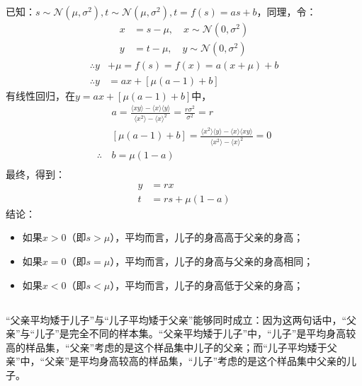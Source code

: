 \documentclass{article}
\begin{document}
\subsection{}
已知：$s\sim \mathcal{N}(\mu,\sigma^2), t\sim \mathcal{N}(\mu,\sigma^2), t = f(s) = as + b$，同理，令：
\begin{align*}
    x &= s - \mu,\quad x\sim \mathcal{N}(0,\sigma^2)\\
    y &= t - \mu,\quad y\sim \mathcal{N}(0,\sigma^2)
\end{align*}
\begin{align*}
    \therefore  y& + \mu = f(s) = f(x) = a(x + \mu) + b\\
    \therefore  y& = ax + [\mu(a-1)+b]
\end{align*}
有线性回归，在$y = ax + [\mu(a-1)+b]$中，
\begin{align*}
    &a = \frac{\langle xy \rangle-\langle x\rangle\langle y\rangle}{\langle x^2\rangle-\langle x\rangle^2} = \frac{r\sigma^2}{\sigma^2} = r\\
    &[\mu(a-1)+b] = \frac{\langle x^2\rangle\langle y\rangle-\langle x\rangle\langle xy\rangle}{\langle x^2\rangle-\langle x\rangle^2} = 0\\
    \therefore \,&b = \mu(1-a)\\
\end{align*}
最终，得到：
\begin{align*}
    y &= rx\\
    t &= rs + \mu(1-a)
\end{align*}
结论：
\begin{itemize}
    \item 如果$x>0$（即$s>\mu$），平均而言，儿子的身高高于父亲的身高；
    \item 如果$x=0$（即$s=\mu$），平均而言，儿子的身高与父亲的身高相同；
    \item 如果$x<0$（即$s<\mu$），平均而言，儿子的身高低于父亲的身高；
\end{itemize}

\subsection{}
“父亲平均矮于儿子”与“儿子平均矮于父亲”能够同时成立：因为这两句话中，“父亲”与“儿子”是完全不同的样本集。“父亲平均矮于儿子”中，“儿子”是平均身高较高的样品集，“父亲”考虑的是这个样品集中儿子的父亲；而“儿子平均矮于父亲”中，“父亲”是平均身高较高的样品集，“儿子”考虑的是这个样品集中父亲的儿子。
\end{document}
